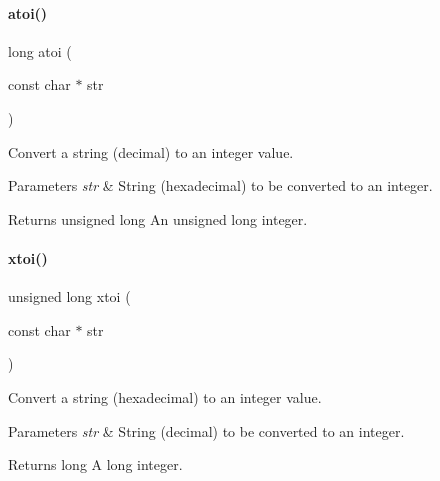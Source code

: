 \paragraph{\texorpdfstring{atoi()}{atoi()}}
{\footnotesize\ttfamily long atoi (\begin{DoxyParamCaption}\item[{const char $\ast$}]{str }\end{DoxyParamCaption})}



Convert a string (decimal) to an integer value. 


\begin{DoxyParams}{Parameters}
{\em str} & String (hexadecimal) to be converted to an integer. \\
\hline
\end{DoxyParams}
\begin{DoxyReturn}{Returns}
unsigned long An unsigned long integer. 
\end{DoxyReturn}
\mbox{\label{a00032_a9d6165da864d16ad50c13690c1e7d7ea}} 
\paragraph{\texorpdfstring{xtoi()}{xtoi()}}
{\footnotesize\ttfamily unsigned long xtoi (\begin{DoxyParamCaption}\item[{const char $\ast$}]{str }\end{DoxyParamCaption})}



Convert a string (hexadecimal) to an integer value. 


\begin{DoxyParams}{Parameters}
{\em str} & String (decimal) to be converted to an integer. \\
\hline
\end{DoxyParams}
\begin{DoxyReturn}{Returns}
long A long integer. 
\end{DoxyReturn}
